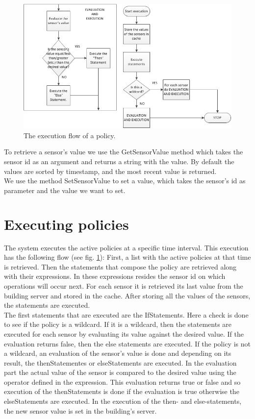 \begin{figure}
	\centering
    \includegraphics[scale=0.65]{images/policy_execution_flow.png} 
	\caption{The execution flow of a policy.}
	\label{fig:policy_execution_workflow}
\end{figure}

To retrieve a sensor's value we use the GetSensorValue method which takes the sensor id as an argument and returns a string with the value. By default the values are sorted by timestamp, and the most recent value is returned.
\\We use the method SetSensorValue to set a value, which takes the sensor's id as parameter and the value we want to set. 

\section{Executing policies} 
The system executes the active policies at a specific time interval. This execution has the following flow (see fig. \ref{fig:policy_execution_workflow}):
First, a list with the active policies at that time is retrieved. Then the statements that compose the policy are retrieved along with their expressions. In these expressions resides the sensor id on which operations will occur next. For each sensor it is retrieved its last value from the building server and stored in the cache. After storing all the values of the sensors, the statements are executed. 
\\The first statements that are executed are the IfStatements. Here a check is done to see if the policy is a wildcard. If it is a wildcard, then the statements are executed for each sensor by evaluating its value against the desired value. If the evaluation returns false, then the else statements are executed. If the policy is not a wildcard, an evaluation of the sensor's value is done and depending on its result, the thenStatementes or elseStatements are executed. 
In the evaluation part the actual value of the sensor is compared to the desired value using the operator defined in the expression. This evaluation returns true or false and so execution of the thenStatements is done if the evaluation is true otherwise the elseStatements are executed.
In the execution of the then- and else-statements, the new sensor value is set in the building's server. 